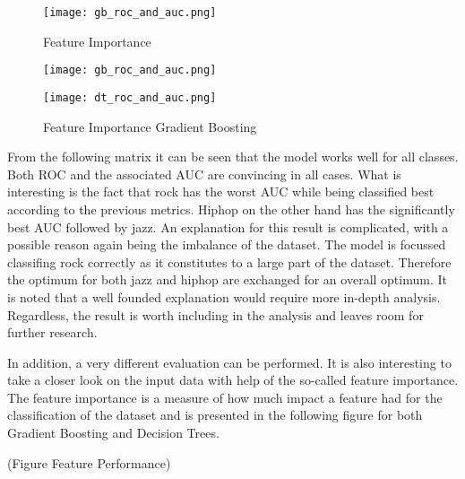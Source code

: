 \begin{figure}[H]
    \centering
    \caption[]{Feature Importance}
	\label{fig:gb_roc_and_auc}
    \texttt{[image: gb\_roc\_and\_auc.png]}
\end{figure}

\begin{figure}[!tbp]
    \centering
    \begin{minipage}[b]{0.4\textwidth}
      \texttt{[image: gb\_roc\_and\_auc.png]}
      \caption{Feature Importance Gradient Boosting}
    \end{minipage}
    \hfill
    \begin{minipage}[b]{0.4\textwidth}
      \texttt{[image: dt\_roc\_and\_auc.png]}
    \end{minipage}
  \end{figure}

From the following matrix it can be seen that the model works well for all classes. Both ROC and the associated AUC are convincing 
in all cases. What is interesting is the fact that rock has the worst AUC while being classified best according to the previous metrics.
Hiphop on the other hand has the significantly best AUC followed by jazz. An explanation for this result is complicated, with a 
possible reason again being the imbalance of the dataset. The model is focussed classifing rock correctly as it constitutes to a large part of the 
dataset. Therefore the optimum for both jazz and hiphop are exchanged for an overall optimum. It is noted that a well founded 
explanation would require more in-depth analysis. Regardless, the result is worth including in the analysis and leaves room for 
further research.   

In addition, a very different evaluation can be performed. It is also interesting to take a closer look on the input data with help of 
the so-called feature importance. The feature importance is a measure of how much impact a feature had for the classification of the 
dataset and is presented in the following figure for both Gradient Boosting and Decision Trees. 

(Figure Feature Performance)

